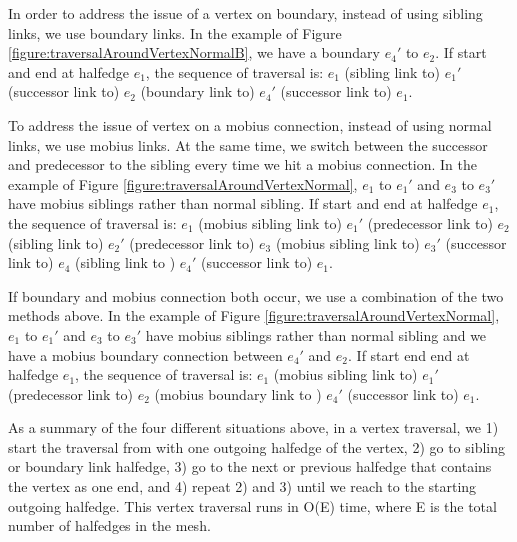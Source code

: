 \documentclass[12pt]{article}
\begin{document}
In order to address the issue of a vertex on boundary, instead of using sibling links, we use boundary links. In the example of Figure \ref{figure:traversalAroundVertexNormalB}, we have a boundary $e_4'$ to $e_2$. If start and end at halfedge $e_1$, the sequence of traversal is: $e_1$ (sibling link to) $e_1'$ (successor link to) $e_2$ (boundary link to) $e_4'$ (successor link to)  $e_1$.

To address the issue of vertex on a mobius connection, instead of using normal links, we use mobius links. At the same time, we switch between the successor and predecessor to the sibling every time we hit a mobius connection.  In the example of Figure \ref{figure:traversalAroundVertexNormal}, $e_1$ to $e_1'$ and $e_3$ to $e_3'$ have mobius siblings rather than normal sibling. If start and end at halfedge $e_1$, the sequence of traversal is: $e_1$ (mobius sibling link to) $e_1'$ (predecessor link to) $e_2$ (sibling link to) $e_2'$ (predecessor link to) $e_3$ (mobius sibling link to) $e_3'$ (successor link to) $e_4$ (sibling link to ) $e_4'$  (successor link to)  $e_1$.

If boundary and mobius connection both occur, we use a combination of the two methods above. In the example of Figure \ref{figure:traversalAroundVertexNormal}, $e_1$ to $e_1'$ and $e_3$ to $e_3'$ have mobius siblings rather than normal sibling and we have a mobius boundary connection between $e_4'$ and $e_2$. If start end end at halfedge $e_1$, the sequence of traversal is: $e_1$ (mobius sibling link to) $e_1'$ (predecessor link to) $e_2$ (mobius boundary link to ) $e_4'$  (successor link to)  $e_1$.

As a summary of the four different situations above, in a vertex traversal, we 1) start the traversal from with one outgoing halfedge of the vertex, 2) go to sibling or boundary link halfedge, 3) go to the next or previous halfedge that contains the vertex as one end, and 4) repeat 2) and 3) until we reach to the starting outgoing halfedge. This vertex traversal runs in O(E) time, where E is the total number of halfedges in the mesh.
\end{document}
